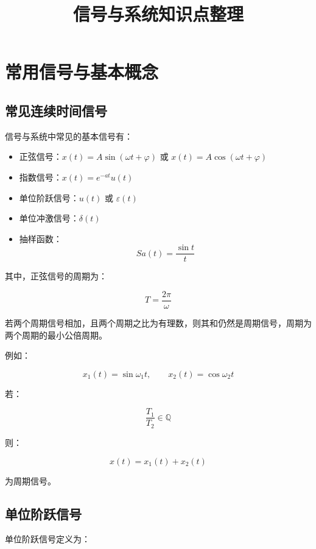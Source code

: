 \documentclass[UTF8]{ctexart}
\title{信号与系统知识点整理}
\author{}
\date{}
\begin{document}
\maketitle
\tableofcontents

\newpage

\section{常用信号与基本概念}

\subsection{常见连续时间信号}

信号与系统中常见的基本信号有：

\begin{tcolorbox}[colback=blue!5!white,colframe=blue!60!black,title=常见信号]
\begin{itemize}
    \item 正弦信号：$x(t)=A\sin(\omega t+\varphi)$ 或 $x(t)=A\cos(\omega t+\varphi)$
    \item 指数信号：$x(t)=e^{-at}u(t)$
    \item 单位阶跃信号：$u(t)$ 或 $\varepsilon(t)$
    \item 单位冲激信号：$\delta(t)$
    \item 抽样函数：
    \[
    Sa(t)=\frac{\sin t}{t}
    \]
\end{itemize}
\end{tcolorbox}

其中，正弦信号的周期为：

\[
T=\frac{2\pi}{\omega}
\]

若两个周期信号相加，且两个周期之比为有理数，则其和仍然是周期信号，周期为两个周期的最小公倍周期。

例如：

\[
x_1(t)=\sin \omega_1 t,\qquad x_2(t)=\cos \omega_2 t
\]

若：

\[
\frac{T_1}{T_2} \in \mathbb{Q}
\]

则：

\[
x(t)=x_1(t)+x_2(t)
\]

为周期信号。

\subsection{单位阶跃信号}

单位阶跃信号定义为：
\end{document}
